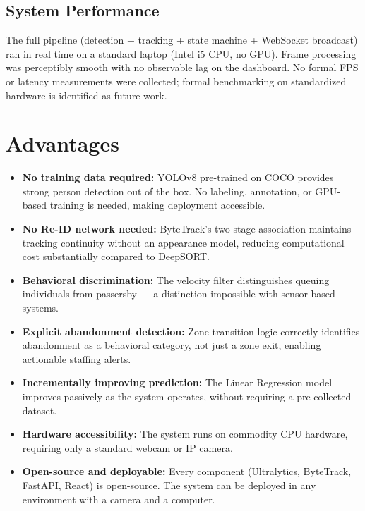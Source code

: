 \documentclass[journal, twocolumn]{IEEEtran}
\begin{document}
\subsection{System Performance}
The full pipeline (detection + tracking + state machine + WebSocket broadcast) ran in real time on a standard laptop (Intel i5 CPU, no GPU). Frame processing was perceptibly smooth with no observable lag on the dashboard. No formal FPS or latency measurements were collected; formal benchmarking on standardized hardware is identified as future work.

\section{Advantages}
\label{sec:adv}

\begin{itemize}
    \item \textbf{No training data required:} YOLOv8 pre-trained on COCO provides strong person detection out of the box. No labeling, annotation, or GPU-based training is needed, making deployment accessible.
    \item \textbf{No Re-ID network needed:} ByteTrack's two-stage association maintains tracking continuity without an appearance model, reducing computational cost substantially compared to DeepSORT.
    \item \textbf{Behavioral discrimination:} The velocity filter distinguishes queuing individuals from passersby — a distinction impossible with sensor-based systems.
    \item \textbf{Explicit abandonment detection:} Zone-transition logic correctly identifies abandonment as a behavioral category, not just a zone exit, enabling actionable staffing alerts.
    \item \textbf{Incrementally improving prediction:} The Linear Regression model improves passively as the system operates, without requiring a pre-collected dataset.
    \item \textbf{Hardware accessibility:} The system runs on commodity CPU hardware, requiring only a standard webcam or IP camera.
    \item \textbf{Open-source and deployable:} Every component (Ultralytics, ByteTrack, FastAPI, React) is open-source. The system can be deployed in any environment with a camera and a computer.
\end{itemize}

\end{document}
